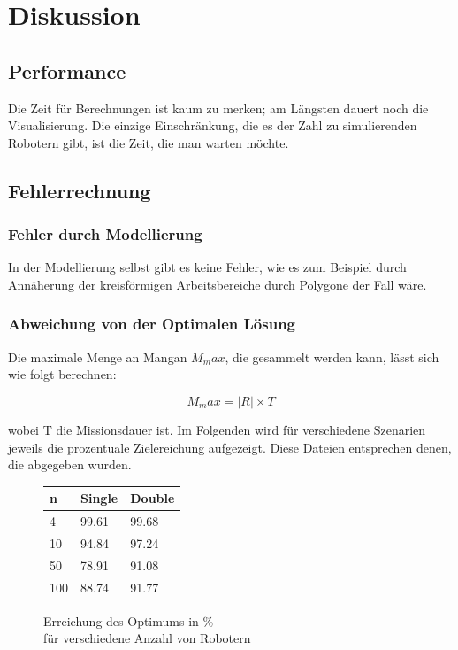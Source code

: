 \documentclass{article}
\begin{document}
\clearpage
\section{Diskussion}

\subsection{Performance}

Die Zeit für Berechnungen ist kaum zu merken; am Längsten dauert noch die Visualisierung. Die einzige Einschränkung, die es der Zahl zu simulierenden Robotern gibt, ist die Zeit, die man warten möchte. 

\subsection{Fehlerrechnung}

\subsubsection{Fehler durch Modellierung}

In der Modellierung selbst gibt es keine Fehler, wie es zum Beispiel durch Annäherung der kreisförmigen Arbeitsbereiche durch Polygone der Fall wäre.

\subsubsection{Abweichung von der Optimalen Lösung}

Die maximale Menge an Mangan $M_max$, die gesammelt werden kann, lässt sich wie folgt berechnen:

\begin{equation*}
M_max = |R| \times T
\end{equation*}

wobei T die Missionsdauer ist. Im Folgenden wird für verschiedene Szenarien jeweils die prozentuale Zielereichung aufgezeigt. Diese Dateien entsprechen denen, die abgegeben wurden.

\begin{figure}[h!]
\centering
\begin{tabular}{ l|l|l }
n   & Single &  Double   \\ \hline
4   & 99.61 & 99.68 \\
10  & 94.84 & 97.24 \\
50  & 78.91 & 91.08 \\
100 & 88.74 & 91.77 \\
\end{tabular}
\caption{Erreichung des Optimums in \% \\ für verschiedene Anzahl von Robotern }
\end{figure}

\newpage

\nocite{*}

\printbibliography[maxnames=25]
\end{document}

